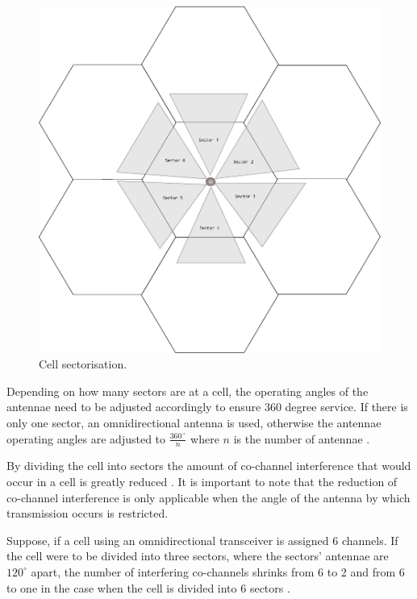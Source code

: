\begin{figure}[H]
	\begin{centering}
	\includegraphics[scale=0.5]{tikz-pics/cellsector.pdf}
	\caption[Cell Sectorization]{Cell sectorisation\cite{GSMSysEngin}.}
	\label{fig:cellsector}
	\end{centering}
\end{figure}

Depending on how many sectors are at a cell, the operating angles of the antennae need to be adjusted accordingly to ensure 360 degree service. If there is only one sector, an omnidirectional antenna is used, otherwise the antennae operating angles are adjusted to $\frac{360\,^{\circ}}{n}$ where ${n}$ is the number of antennae \cite{Eisenblatter}.

By dividing the cell into sectors the amount of co-channel interference that would occur in a cell is greatly reduced \cite{GSMArchitectureProtocolsServices}. It is important to note that the reduction of co-channel interference is only applicable when the angle of the antenna by which transmission occurs is restricted\cite{GSMArchitectureProtocolsServices}.

Suppose, if a cell using an omnidirectional transceiver is assigned 6 channels. If the cell were to be divided into three sectors, where the sectors' antennae are $120^\circ$ apart, the number of interfering co-channels shrinks from 6 to 2 and from 6 to one in the case when the cell is divided into 6 sectors \cite{GSMSysEngin,GSM92,GSMArchitectureProtocolsServices}.

